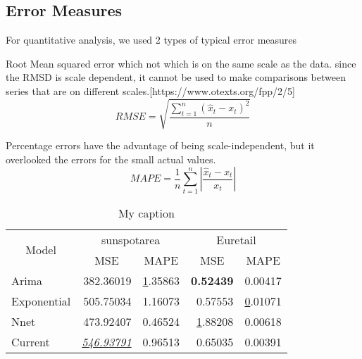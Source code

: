 
\subsection{Error Measures}

For quantitative analysis, we used 2 types of  typical error measures 

Root Mean squared error which  not which is on the same scale as the data. since the RMSD is scale dependent, it cannot be used to make comparisons between series that are on different scales.[https://www.otexts.org/fpp/2/5]
$$RMSE=\sqrt{\frac{\sum_{t=1}^{n}(\hat{x}_{t}-x_{t})^{2}}{n}}$$


Percentage errors have the advantage of being scale-independent, but it overlooked the errors for the small actual values.
$$ MAPE=\frac{1}{n}\sum_{t=1}^{n}\left | \frac{\hat{x}_{t}-x_{t}}{x_{t}} \right |$$
\begin{table}[]
\centering
\caption{My caption}
\label{my-label}
\begin{tabular}{lrrrr}
\hline
\multicolumn{1}{c}{\multirow{2}{*}{Model}} & \multicolumn{2}{c}{sunspotarea}                                                    & \multicolumn{2}{c}{Euretail}                                               \\ \cline{2-5} 
\multicolumn{1}{c}{}                       & \multicolumn{1}{c|}{MSE}                      & \multicolumn{1}{c|}{MAPE}          & \multicolumn{1}{c|}{MSE}              & \multicolumn{1}{c|}{MAPE}          \\ \hline
\multicolumn{1}{|l|}{Arima}                & \multicolumn{1}{r|}{382.36019}                & \multicolumn{1}{r|}{{\ul 1.35863}} & \multicolumn{1}{r|}{\textbf{0.52439}} & \multicolumn{1}{r|}{0.00417}       \\ \hline
\multicolumn{1}{|l|}{Exponential}          & \multicolumn{1}{r|}{505.75034}                & \multicolumn{1}{r|}{1.16073}       & \multicolumn{1}{r|}{0.57553}          & \multicolumn{1}{r|}{{\ul 0.01071}} \\ \hline
\multicolumn{1}{|l|}{Nnet}                 & \multicolumn{1}{r|}{473.92407}                & \multicolumn{1}{r|}{0.46524}       & \multicolumn{1}{r|}{{\ul 1.88208}}    & \multicolumn{1}{r|}{0.00618}       \\ \hline
\multicolumn{1}{|l|}{Current}              & \multicolumn{1}{r|}{{\ul \textit{546.93791}}} & \multicolumn{1}{r|}{0.96513}       & \multicolumn{1}{r|}{0.65035}          & \multicolumn{1}{r|}{0.00391}       \\ \hline
\end{tabular}
\end{table}


